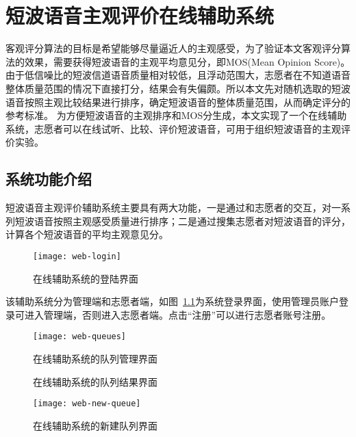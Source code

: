\chapter{短波语音主观评价在线辅助系统} \label{chapter:web}


客观评分算法的目标是希望能够尽量逼近人的主观感受，为了验证本文客观评分算法的效果，需要获得短波语音的主观平均意见分，即MOS(Mean Opinion Score)。由于低信噪比的短波信道语音质量相对较低，且浮动范围大，志愿者在不知道语音整体质量范围的情况下直接打分，结果会有失偏颇。所以本文先对随机选取的短波语音按照主观比较结果进行排序，确定短波语音的整体质量范围，从而确定评分的参考标准。
为方便短波语音的主观排序和MOS分生成，本文实现了一个在线辅助系统，志愿者可以在线试听、比较、评价短波语音，可用于组织短波语音的主观评价实验。

\section{系统功能介绍}

短波语音主观评价辅助系统主要具有两大功能，一是通过和志愿者的交互，对一系列短波语音按照主观感受质量进行排序；二是通过搜集志愿者对短波语音的评分，计算各个短波语音的平均主观意见分。

\begin{figure}
\centering
\texttt{[image: web-login]}
\caption{在线辅助系统的登陆界面\label{fig:web-login}}
\end{figure}

该辅助系统分为管理端和志愿者端，如图~\ref{fig:web-login}为系统登录界面，使用管理员账户登录可进入管理端，否则进入志愿者端。点击“注册”可以进行志愿者账号注册。

\begin{figure}
\centering
\texttt{[image: web-queues]}
\caption{在线辅助系统的队列管理界面\label{fig:web-queues}}
\end{figure}

\begin{figure}
\centering
{}
\caption{在线辅助系统的队列结果界面\label{fig:web-result}}
\end{figure}

\begin{figure}
\centering
\texttt{[image: web-new-queue]}
\caption{在线辅助系统的新建队列界面\label{fig:web-new-queue}}
\end{figure}

